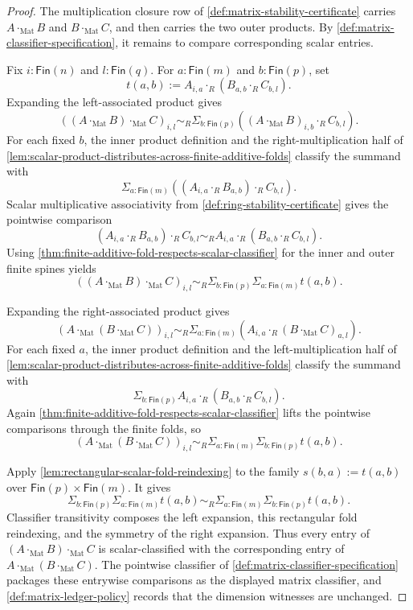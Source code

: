 \begin{proof}
The multiplication closure row of \autoref{def:matrix-stability-certificate}
carries $A\cdot_{\mathrm{Mat}}B$ and $B\cdot_{\mathrm{Mat}}C$, and then
carries the two outer products. By \autoref{def:matrix-classifier-specification},
it remains to compare corresponding scalar entries.

Fix $i:\mathsf{Fin}(n)$ and $l:\mathsf{Fin}(q)$. For $a:\mathsf{Fin}(m)$ and
$b:\mathsf{Fin}(p)$, set
$$
t(a,b):=A_{i,a}\cdot_R(B_{a,b}\cdot_RC_{b,l}).
$$
Expanding the left-associated product gives
$$
((A\cdot_{\mathrm{Mat}}B)\cdot_{\mathrm{Mat}}C)_{i,l}
\sim_R
\Sigma_{b:\mathsf{Fin}(p)}((A\cdot_{\mathrm{Mat}}B)_{i,b}\cdot_RC_{b,l}).
$$
For each fixed $b$, the inner product definition and the right-multiplication
half of \autoref{lem:scalar-product-distributes-across-finite-additive-folds}
classify the summand with
$$
\Sigma_{a:\mathsf{Fin}(m)}((A_{i,a}\cdot_RB_{a,b})\cdot_RC_{b,l}).
$$
Scalar multiplicative associativity from
\autoref{def:ring-stability-certificate} gives the pointwise comparison
$$
(A_{i,a}\cdot_RB_{a,b})\cdot_RC_{b,l}
\sim_R
A_{i,a}\cdot_R(B_{a,b}\cdot_RC_{b,l}).
$$
Using \autoref{thm:finite-additive-fold-respects-scalar-classifier} for the
inner and outer finite spines yields
$$
((A\cdot_{\mathrm{Mat}}B)\cdot_{\mathrm{Mat}}C)_{i,l}
\sim_R
\Sigma_{b:\mathsf{Fin}(p)}\Sigma_{a:\mathsf{Fin}(m)}t(a,b).
$$

Expanding the right-associated product gives
$$
(A\cdot_{\mathrm{Mat}}(B\cdot_{\mathrm{Mat}}C))_{i,l}
\sim_R
\Sigma_{a:\mathsf{Fin}(m)}(A_{i,a}\cdot_R(B\cdot_{\mathrm{Mat}}C)_{a,l}).
$$
For each fixed $a$, the inner product definition and the left-multiplication
half of \autoref{lem:scalar-product-distributes-across-finite-additive-folds}
classify the summand with
$$
\Sigma_{b:\mathsf{Fin}(p)}A_{i,a}\cdot_R(B_{a,b}\cdot_RC_{b,l}).
$$
Again \autoref{thm:finite-additive-fold-respects-scalar-classifier} lifts the
pointwise comparisons through the finite folds, so
$$
(A\cdot_{\mathrm{Mat}}(B\cdot_{\mathrm{Mat}}C))_{i,l}
\sim_R
\Sigma_{a:\mathsf{Fin}(m)}\Sigma_{b:\mathsf{Fin}(p)}t(a,b).
$$

Apply \autoref{lem:rectangular-scalar-fold-reindexing} to the family
$s(b,a):=t(a,b)$ over $\mathsf{Fin}(p)\times\mathsf{Fin}(m)$. It gives
$$
\Sigma_{b:\mathsf{Fin}(p)}\Sigma_{a:\mathsf{Fin}(m)}t(a,b)
\sim_R
\Sigma_{a:\mathsf{Fin}(m)}\Sigma_{b:\mathsf{Fin}(p)}t(a,b).
$$
Classifier transitivity composes the left expansion, this rectangular fold
reindexing, and the symmetry of the right expansion. Thus every entry of
$(A\cdot_{\mathrm{Mat}}B)\cdot_{\mathrm{Mat}}C$ is scalar-classified with the
corresponding entry of $A\cdot_{\mathrm{Mat}}(B\cdot_{\mathrm{Mat}}C)$. The
pointwise classifier of \autoref{def:matrix-classifier-specification} packages
these entrywise comparisons as the displayed matrix classifier, and
\autoref{def:matrix-ledger-policy} records that the dimension witnesses are
unchanged.
\end{proof}
